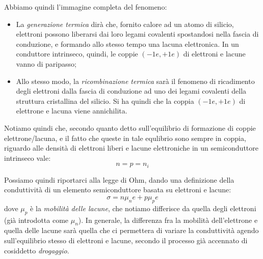 \documentclass[a4paper,11pt]{article}
\begin{document}
Abbiamo quindi l'immagine completa del fenomeno:
\begin{itemize}
	\item 
La \textit{generazione termica} dirà che, fornito calore ad un atomo di silicio, elettroni possono liberarsi dai loro legami covalenti spostandosi nella fascia di conduzione, e formando allo stesso tempo una lacuna elettronica. In un conduttore intrinseco, quindi, le coppie $(-1 e, +1 e)$ di elettroni e lacune vanno di paripasso;
	\item 
Allo stesso modo, la \textit{ricombinazione termica} sarà il fenomeno di ricadimento degli elettroni dalla fascia di conduzione ad uno dei legami covalenti della struttura cristallina del silicio. Si ha quindi che la coppia $(-1 e, +1 e)$ di elettrone e lacuna viene annichilita.
\end{itemize}

Notiamo quindi che, secondo quanto detto sull'equilibrio di formazione di coppie elettrone/lacuna, e il fatto che queste in tale equlibrio sono sempre in coppia, riguardo alle densità di elettroni liberi e lacune elettroniche in un semiconduttore intrinseco vale:
$$
n = p = n_i
$$

Possiamo quindi riportarci alla legge di Ohm, dando una definizione della conduttività di un elemento semiconduttore basata su elettroni e lacune:
$$
\sigma = n \mu_n e + p \mu_p e
$$
dove $\mu_p$ è la \textit{mobilità delle lacune}, che notiamo differisce da quella degli elettroni (già introdotta come $\mu_n$). In generale, la differenza fra la mobilità dell'elettrone e quella delle lacune sarà quella che ci permettera di variare la conduttività agendo sull'equilibrio stesso di elettroni e lacune, secondo il processo già accennato di cosiddetto \textit{drogaggio}.
\end{document}
